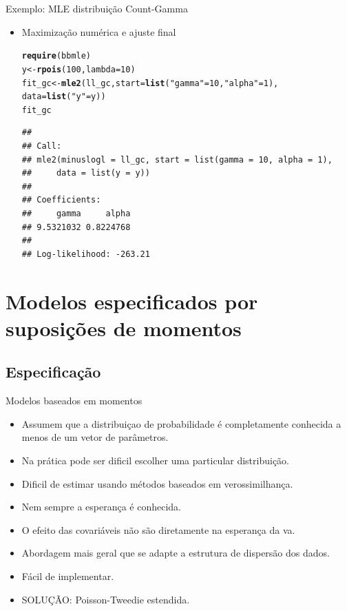 \documentclass[10pt, aspectratio=169]{beamer}\usepackage[]{graphicx}\usepackage[]{color}
\makeatletter
\newcommand{\hlnum}[1]{\textcolor[rgb]{0.686,0.059,0.569}{#1}}%
\newcommand{\hlstr}[1]{\textcolor[rgb]{0.192,0.494,0.8}{#1}}%
\newcommand{\hlstd}[1]{\textcolor[rgb]{0.345,0.345,0.345}{#1}}%
\newcommand{\hlkwb}[1]{\textcolor[rgb]{0.69,0.353,0.396}{#1}}%
\newcommand{\hlkwc}[1]{\textcolor[rgb]{0.333,0.667,0.333}{#1}}%
\newcommand{\hlkwd}[1]{\textcolor[rgb]{0.737,0.353,0.396}{\textbf{#1}}}%
\newenvironment{kframe}{%
 \def\at@end@of@kframe{}%
 \ifinner\ifhmode%
  \def\at@end@of@kframe{\end{minipage}}%
  \begin{minipage}{\columnwidth}%
 \fi\fi%
 \def\FrameCommand##1{\hskip\@totalleftmargin \hskip-\fboxsep
 \colorbox{shadecolor}{##1}\hskip-\fboxsep
     \hskip-\linewidth \hskip-\@totalleftmargin \hskip\columnwidth}%
 \MakeFramed {\advance\hsize-\width
   \@totalleftmargin\z@ \linewidth\hsize
   \@setminipage}}%
 {\par\unskip\endMakeFramed%
 \at@end@of@kframe}
\newenvironment{knitrout}{}{} %
\makeatother
\begin{document}
\begin{frame}[fragile]{Exemplo: MLE distribuição Count-Gamma}
\begin{itemize}
  \item Maximização numérica e ajuste final
\begin{knitrout}
\color{fgcolor}\begin{kframe}
\begin{alltt}
\hlkwd{require}\hlstd{(bbmle)}
\hlstd{y} \hlkwb{<-} \hlkwd{rpois}\hlstd{(}\hlnum{100}\hlstd{,} \hlkwc{lambda} \hlstd{=} \hlnum{10}\hlstd{)}
\hlstd{fit_gc} \hlkwb{<-} \hlkwd{mle2}\hlstd{(ll_gc,} \hlkwc{start} \hlstd{=} \hlkwd{list}\hlstd{(}\hlstr{"gamma"} \hlstd{=} \hlnum{10}\hlstd{,} \hlstr{"alpha"} \hlstd{=} \hlnum{1}\hlstd{),}
               \hlkwc{data} \hlstd{=} \hlkwd{list}\hlstd{(}\hlstr{"y"} \hlstd{= y))}
\hlstd{fit_gc}
\end{alltt}
\begin{verbatim}
## 
## Call:
## mle2(minuslogl = ll_gc, start = list(gamma = 10, alpha = 1), 
##     data = list(y = y))
## 
## Coefficients:
##     gamma     alpha 
## 9.5321032 0.8224768 
## 
## Log-likelihood: -263.21
\end{verbatim}
\end{kframe}
\end{knitrout}

\end{itemize}
\end{frame}

\section{Modelos especificados por suposições de momentos}
\label{Section4}




\subsection{Especificação}
\begin{frame}{Modelos baseados em momentos}
\begin{itemize}
  \item Assumem que a distribuiçao de probabilidade é completamente
  conhecida a menos de um vetor de parâmetros.
  \item Na prática pode ser dificil escolher uma particular distribuição.
  \item Dificil de estimar usando métodos baseados em verossimilhança.
  \item Nem sempre a esperança é conhecida.
  \item O efeito das covariáveis não são diretamente na esperança da va.
  \item Abordagem mais geral que se adapte a estrutura de dispersão dos dados.
  \item Fácil de implementar.
  \item SOLUÇÃO: Poisson-Tweedie estendida.
\end{itemize}
\end{frame}
\end{document}
